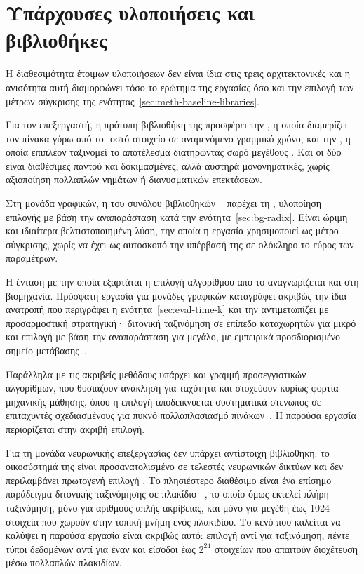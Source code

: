 \section{Υπάρχουσες υλοποιήσεις και βιβλιοθήκες}
\label{sec:bg-related}

Η διαθεσιμότητα έτοιμων υλοποιήσεων δεν είναι ίδια στις τρεις αρχιτεκτονικές
και η ανισότητα αυτή διαμορφώνει τόσο το ερώτημα της εργασίας όσο και την
επιλογή των μέτρων σύγκρισης της ενότητας~\ref{sec:meth-baseline-libraries}.

Για τον επεξεργαστή, η πρότυπη βιβλιοθήκη της  προσφέρει την
, η οποία διαμερίζει τον πίνακα γύρω από το -οστό
στοιχείο σε αναμενόμενο γραμμικό χρόνο, και την , η
οποία επιπλέον ταξινομεί το αποτέλεσμα διατηρώντας σωρό μεγέθους . Και οι
δύο είναι διαθέσιμες παντού και δοκιμασμένες, αλλά αυστηρά μονονηματικές, χωρίς
αξιοποίηση πολλαπλών νημάτων ή διανυσματικών επεκτάσεων.

Στη μονάδα γραφικών, η  του συνόλου βιβλιοθηκών ~\cite{cccl}
παρέχει τη , υλοποίηση επιλογής με βάση την αναπαράσταση κατά
την ενότητα~\ref{sec:bg-radix}. Είναι ώριμη και ιδιαίτερα βελτιστοποιημένη
λύση, την οποία η εργασία χρησιμοποιεί ως μέτρο σύγκρισης, χωρίς να έχει ως
αυτοσκοπό την υπέρβασή της σε ολόκληρο το εύρος των παραμέτρων.

Η ένταση με την οποία εξαρτάται η επιλογή αλγορίθμου από το 
αναγνωρίζεται και στη βιομηχανία. Πρόσφατη εργασία για μονάδες γραφικών
 καταγράφει ακριβώς την ίδια ανατροπή που περιγράφει η
ενότητα~\ref{sec:eval-time-k} και την αντιμετωπίζει με προσαρμοστική
στρατηγική· διτονική ταξινόμηση σε επίπεδο καταχωρητών για μικρό  και
επιλογή με βάση την αναπαράσταση για μεγάλο, με εμπειρικά προσδιορισμένο σημείο
μετάβασης~\cite{lin2026adaptivetopk}.

Παράλληλα με τις ακριβείς μεθόδους υπάρχει και γραμμή προσεγγιστικών
αλγορίθμων, που θυσιάζουν ανάκληση για ταχύτητα και στοχεύουν κυρίως φορτία
μηχανικής μάθησης, όπου η επιλογή  αποδεικνύεται συστηματικά στενωπός
σε επιταχυντές σχεδιασμένους για πυκνό πολλαπλασιασμό
πινάκων~\cite{samaga2026}. Η παρούσα εργασία περιορίζεται στην ακριβή επιλογή.

Για τη μονάδα νευρωνικής επεξεργασίας δεν υπάρχει αντίστοιχη βιβλιοθήκη: το
οικοσύστημά της είναι προσανατολισμένο σε τελεστές νευρωνικών δικτύων και δεν
περιλαμβάνει πρωτογενή επιλογή . Το πλησιέστερο διαθέσιμο είναι ένα
επίσημο παράδειγμα διτονικής ταξινόμησης σε πλακίδιο ~\cite{amd2024bitonicaie}, το οποίο όμως εκτελεί πλήρη ταξινόμηση, μόνο
για αριθμούς απλής ακρίβειας, και μόνο για μεγέθη έως 1024 στοιχεία που χωρούν
στην τοπική μνήμη ενός πλακιδίου. Το κενό που καλείται να καλύψει η παρούσα
εργασία είναι ακριβώς αυτό: επιλογή αντί για ταξινόμηση, πέντε τύποι δεδομένων
αντί για έναν και είσοδοι έως $2^{24}$ στοιχείων που απαιτούν διοχέτευση μέσω
πολλαπλών πλακιδίων.

